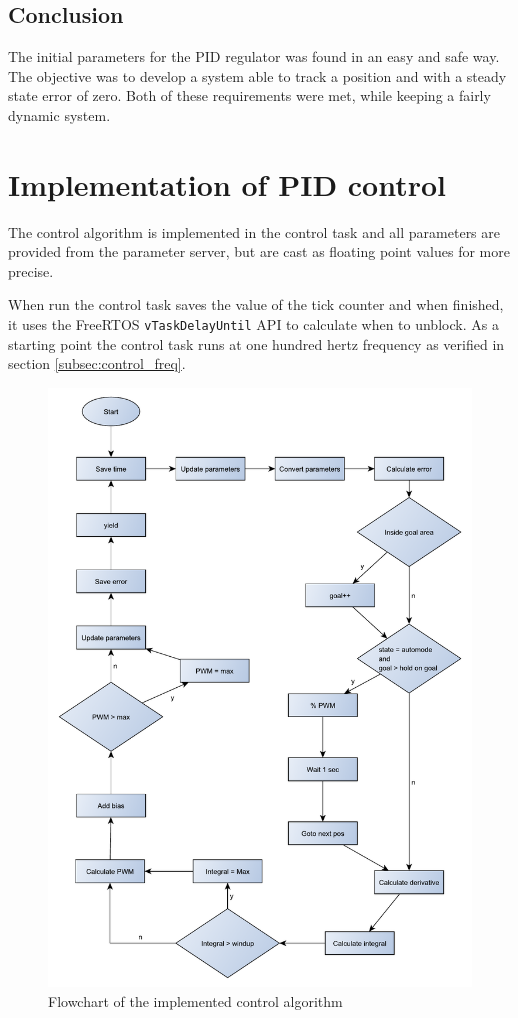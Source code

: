 \subsection{Conclusion}
The initial parameters for the PID regulator was found in an easy and safe way. The objective was to develop a system able to track a position and with a steady state error of zero. Both of these requirements were met, while keeping a fairly dynamic system.


\section{Implementation of PID control}
The control algorithm is implemented in the control task and all parameters are provided from the parameter server, but are cast as  floating point values for more precise.

When run the control task saves the value of the tick counter and when finished, it uses the FreeRTOS \texttt{vTaskDelayUntil} API to calculate when to unblock. As a starting point the control task runs at one hundred hertz frequency as verified in section \ref{subsec:control_freq}.

\begin{figure}[htb]
	\centering
	\includegraphics[width=\textwidth,trim=0 0 0 0]{graphics/control_alg_diagram.pdf}
	\caption{Flowchart of the implemented control algorithm}
	\label{fig:pid_flow}			
\end{figure}

